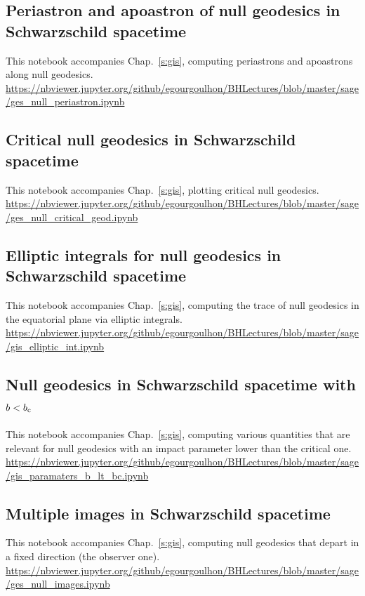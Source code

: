 \subsection{Periastron and apoastron of null geodesics in Schwarzschild spacetime} \label{s:sam:ges_null_periastron}
%
This notebook accompanies Chap.~\ref{s:gis}, computing periastrons and apoastrons
along null geodesics.\\[1ex]
{\footnotesize
\url{https://nbviewer.jupyter.org/github/egourgoulhon/BHLectures/blob/master/sage/ges_null_periastron.ipynb}
}

\subsection{Critical null geodesics in Schwarzschild spacetime} \label{s:sam:ges_null_critical_geod}
%
This notebook accompanies Chap.~\ref{s:gis}, plotting critical null geodesics.\\[1ex]
{\footnotesize
\url{https://nbviewer.jupyter.org/github/egourgoulhon/BHLectures/blob/master/sage/ges_null_critical_geod.ipynb}
}

\subsection{Elliptic integrals for null geodesics in Schwarzschild spacetime} \label{s:sam:gis_elliptic_int}
%
This notebook accompanies Chap.~\ref{s:gis}, computing the trace of null
geodesics in the equatorial plane via elliptic integrals.\\[1ex]
{\footnotesize
\url{https://nbviewer.jupyter.org/github/egourgoulhon/BHLectures/blob/master/sage/gis_elliptic_int.ipynb}
}

\subsection{Null geodesics in Schwarzschild spacetime with \texorpdfstring{$b<b_{\rm c}$}{b<bc}} \label{s:sam:gis_paramaters_b_lt_bc}
%
This notebook accompanies Chap.~\ref{s:gis}, computing various quantities that
are relevant for null geodesics with an impact parameter lower than the critical one.\\[1ex]
{\footnotesize
\url{https://nbviewer.jupyter.org/github/egourgoulhon/BHLectures/blob/master/sage/gis_paramaters_b_lt_bc.ipynb}
}

\subsection{Multiple images in Schwarzschild spacetime} \label{s:sam:ges_null_images}
%
This notebook accompanies Chap.~\ref{s:gis}, computing null geodesics that
depart in a fixed direction (the observer one).\\[1ex]
{\footnotesize
\url{https://nbviewer.jupyter.org/github/egourgoulhon/BHLectures/blob/master/sage/ges_null_images.ipynb}
}

